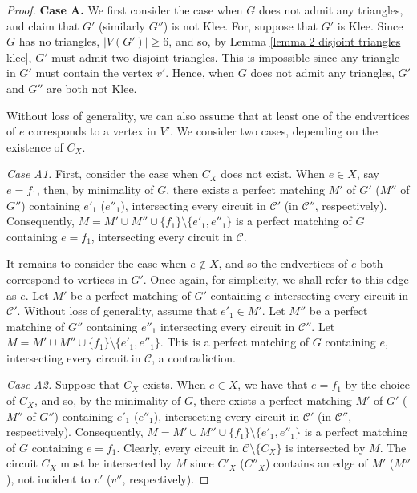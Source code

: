 \documentclass[]{theclass}
\begin{document}
\begin{proof}
\textbf{Case A.} We first consider the case when $G$ does not admit any triangles, and claim that $G'$ (similarly $G''$) is not Klee. For, suppose that $G'$ is Klee. Since $G$ has no triangles, $|V(G')|\geq 6$, and so, by Lemma \ref{lemma 2 disjoint triangles klee}, $G'$ must admit two disjoint triangles. This is impossible since any triangle in $G'$ must contain the vertex $v'$. Hence, when $G$ does not admit any triangles, $G'$ and $G''$ are both not Klee.

Without loss of generality, we can also assume that at least one of the endvertices of $e$ corresponds to a vertex in $V'$. 
We consider two cases, depending on the existence of $C_X$. 

\emph{Case A1.} First, consider the case when $C_X$ does not exist. When $e\in X$, say $e=f_{1}$, then, by minimality of $G$, there exists a perfect matching $M'$ of $G'$ ($M''$ of $G''$) containing $e'_{1}$ ($e''_{1}$), intersecting every circuit in $\mathcal{C}'$ (in $\mathcal{C}''$, respectively). Consequently, $M=M'\cup M''\cup \{f_{1}\}\setminus\{e'_{1},e''_{1}\}$ is a perfect matching of $G$ containing $e=f_1$, intersecting every circuit in $\mathcal{C}$.

It remains to consider the case when $e\notin X$, and so the endvertices of $e$ both correspond to vertices in $G'$. Once again, for simplicity, we shall refer to this edge as $e$. Let $M'$ be a perfect matching of $G'$ containing $e$ intersecting every circuit in $\mathcal{C}'$. Without loss of generality, assume that $e'_{1}\in M'$. Let $M''$ be a perfect matching of $G''$ containing $e''_{1}$ intersecting every circuit in $\mathcal{C}''$. Let $M=M'\cup M''\cup \{f_{1}\}\setminus \{e'_{1},e''_{1}\}$. This is a perfect matching of $G$ containing $e$, intersecting every circuit in $\mathcal{C}$, a contradiction. 


\emph{Case A2.} Suppose that $C_X$ exists. 
When $e\in X$, we have that $e=f_1$ by the choice of $C_X$, and so, by the minimality of $G$, there exists a perfect matching $M'$ of $G'$ ($M''$ of $G''$) containing $e'_{1}$ ($e''_{1}$), intersecting every circuit in $\mathcal{C}'$ (in $\mathcal{C}''$, respectively). Consequently, $M=M'\cup M''\cup \{f_{1}\}\setminus\{e'_{1},e''_{1}\}$ is a perfect matching of $G$ containing $e=f_1$.
Clearly, every circuit in $\mathcal{C}\setminus \{C_X\}$ is intersected by $M$. The circuit $C_X$ must be intersected by $M$ since $C'_X$ ($C''_X$) contains an edge of $M'$ ($M''$), not incident to $v'$ ($v''$, respectively). 


\end{proof}
\end{document}

